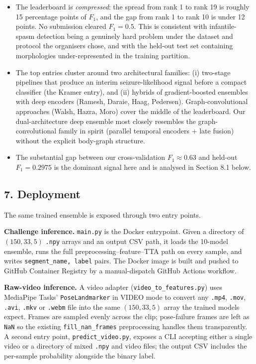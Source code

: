 \documentclass[
  11pt,
]{article}
\providecommand{\tightlist}{%
  \setlength{\itemsep}{0pt}\setlength{\parskip}{0pt}}
\begin{document}
\begin{itemize}
\tightlist
\item
  The leaderboard is \emph{compressed}: the spread from rank 1 to rank
  19 is roughly 15 percentage points of \(F_1\), and the gap from rank 1
  to rank 10 is under 12 points. No submission cleared \(F_1 = 0.5\).
  This is consistent with infantile-spasm detection being a genuinely
  hard problem under the dataset and protocol the organisers chose, and
  with the held-out test set containing morphologies under-represented
  in the training partition.
\item
  The top entries cluster around two architectural families: (i)
  two-stage pipelines that produce an interim seizure-likelihood signal
  before a compact classifier (the Kramer entry), and (ii) hybrids of
  gradient-boosted ensembles with deep encoders (Ramesh, Daraie, Haag,
  Pedersen). Graph-convolutional approaches (Walsh, Hazra, Moro) cover
  the middle of the leaderboard. Our dual-architecture deep ensemble
  most closely resembles the graph-convolutional family in spirit
  (parallel temporal encoders + late fusion) without the explicit
  body-graph structure.
\item
  The substantial gap between our cross-validation \(F_1 \approx 0.63\)
  and held-out \(F_1 = 0.2975\) is the dominant signal here and is
  analysed in Section 8.1 below.
\end{itemize}

\subsection{7. Deployment}\label{deployment}

The same trained ensemble is exposed through two entry points.

\textbf{Challenge inference.} \texttt{main.py} is the Docker entrypoint.
Given a directory of \((150, 33, 5)\) \texttt{.npy} arrays and an output
CSV path, it loads the 10-model ensemble, runs the full
preprocessing--feature--TTA path on every sample, and writes
\texttt{segment\_name,\ label} pairs. The Docker image is built and
pushed to GitHub Container Registry by a manual-dispatch GitHub Actions
workflow.

\textbf{Raw-video inference.} A video adapter
(\texttt{video\_to\_features.py}) uses MediaPipe Tasks'
\texttt{PoseLandmarker} in VIDEO mode to convert any \texttt{.mp4},
\texttt{.mov}, \texttt{.avi}, \texttt{.mkv} or \texttt{.webm} file into
the same \((150, 33, 5)\) array the trained models expect. Frames are
sampled evenly across the clip; pose-failure frames are left as
\texttt{NaN} so the existing \texttt{fill\_nan\_frames} preprocessing
handles them transparently. A second entry point,
\texttt{predict\_video.py}, exposes a CLI accepting either a single
video or a directory of mixed \texttt{.npy} and video files; the output
CSV includes the per-sample probability alongside the binary label.
\end{document}
